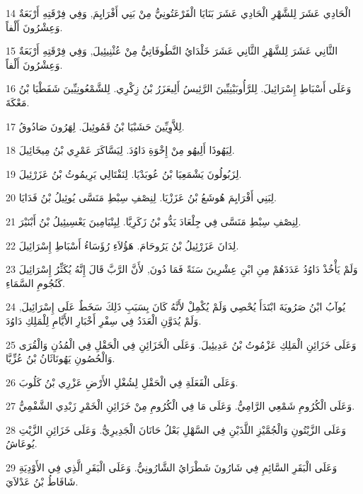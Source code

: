 \par 14 الْحَادِي عَشَرَ لِلشَّهْرِ الْحَادِي عَشَرَ بَنَايَا الْفَرْعَتُونِيُّ مِنْ بَنِي أَفْرَايِمَ, وَفِي فِرْقَتِهِ أَرْبَعَةٌ وَعِشْرُونَ أَلْفاً.
\par 15 الثَّانِي عَشَرَ لِلشَّهْرِ الثَّانِي عَشَرَ خَلْدَايُ النَّطُوفَاتِيُّ مِنْ عُثْنِيئِيلَ, وَفِي فِرْقَتِهِ أَرْبَعَةٌ وَعِشْرُونَ أَلْفاً.
\par 16 وَعَلَى أَسْبَاطِ إِسْرَائِيلَ. لِلرَّأُوبَيْنِيِّينَ الرَّئِيسُ أَلِيعَزَرُ بْنُ زِكْرِي. لِلشَّمْعُونِيِّينَ شَفَطْيَا بْنُ مَعْكَةَ.
\par 17 لِلاَّوِيِّينَ حَشَبْيَا بْنُ قَمُوئِيلَ. لِهَرُونَ صَادُوقُ.
\par 18 لِيَهُوذَا أَلِيهُو مِنْ إِخْوَةِ دَاوُدَ. لِيَسَّاكَرَ عَمْرِي بْنُ مِيخَائِيلَ.
\par 19 لِزَبُولُونَ يَشْمَعِيَا بْنُ عُوبَدْيَا. لِنَفْتَالِي يَرِيمُوثُ بْنُ عَزَرْئِيلَ.
\par 20 لِبَنِي أَفْرَايِمَ هُوشَعُ بْنُ عَزَزْيَا. لِنِصْفِ سِبْطِ مَنَسَّى يُوئِيلُ بْنُ فَدَايَا.
\par 21 لِنِصْفِ سِبْطِ مَنَسَّى فِي جِلْعَادَ يَدُّو بْنُ زَكَرِيَّا. لِبِنْيَامِينَ يَعْسِيئِيلُ بْنُ أَبْنَيْرَ.
\par 22 لِدَانَ عَزَرْئِيلُ بْنُ يَرُوحَامَ. هَؤُلاَءِ رُؤَسَاءُ أَسْبَاطِ إِسْرَائِيلَ.
\par 23 وَلَمْ يَأْخُذْ دَاوُدُ عَدَدَهُمْ مِنِ ابْنِ عِشْرِينَ سَنَةً فَمَا دُونَ, لأَنَّ الرَّبَّ قَالَ إِنَّهُ يُكَثِّرُ إِسْرَائِيلَ كَنُجُومِ السَّمَاءِ.
\par 24 يُوآبُ ابْنُ صَرُويَةَ ابْتَدَأَ يُحْصِي وَلَمْ يُكْمِلْ لأَنَّهُ كَانَ بِسَبَبِ ذَلِكَ سَخَطٌ عَلَى إِسْرَائِيلَ, وَلَمْ يُدَوَّنِ الْعَدَدُ فِي سِفْرِ أَخْبَارِ الأَيَّامِ لِلْمَلِكِ دَاوُدَ.
\par 25 وَعَلَى خَزَائِنِ الْمَلِكِ عَزْمُوتُ بْنُ عَدِيئِيلَ. وَعَلَى الْخَزَائِنِ فِي الْحَقْلِ فِي الْمُدُنِ وَالْقُرَى وَالْحُصُونِ يَهُونَاثَانُ بْنُ عُزِّيَّا.
\par 26 وَعَلَى الْفَعَلَةِ فِي الْحَقْلِ لِشُغْلِ الأَرْضِ عَزْرِي بْنُ كَلُوبَ.
\par 27 وَعَلَى الْكُرُومِ شَمْعِي الرَّامِيُّ. وَعَلَى مَا فِي الْكُرُومِ مِنْ خَزَائِنِ الْخَمْرِ زَبْدِي الشَّفْمِيُّ.
\par 28 وَعَلَى الزَّيْتُونِ وَالْجُمَّيْزِ اللَّذَيْنِ فِي السَّهْلِ بَعْلُ حَانَانَ الْجَدِيرِيُّ. وَعَلَى خَزَائِنِ الزَّيْتِ يُوعَاشُ.
\par 29 وَعَلَى الْبَقَرِ السَّائِمِ فِي شَارُونَ شَطْرَايُ الشَّارُونِيُّ. وَعَلَى الْبَقَرِ الَّذِي فِي الأَوْدِيَةِ شَافَاطُ بْنُ عَدْلاَيَ.
